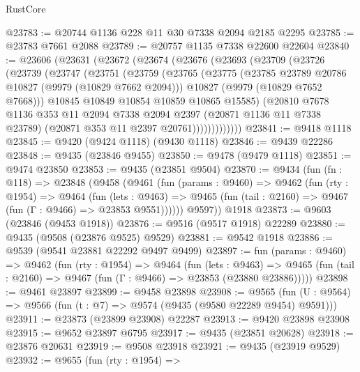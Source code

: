 \begin{lexlean}{RustCore}
\begin{coremodule}
@23783 := @20744 @1136 @228 @11 @30 @7338 @2094 @2185 @2295
@23785 := @23783 @7661 @2088
@23789 := @20757 @1135 @7338 @22600 @22604
@23840 := @23606
    (@23631
      (@23672
        (@23674
          (@23676
            (@23693
              (@23709
                (@23726
                  (@23739
                    (@23747
                      (@23751
                        (@23759
                          (@23765
                            (@23775
                              (@23785 @23789 @20786 @10827 (@9979 (@10829 @7662 @2094)))
                              @10827
                              (@9979 (@10829 @7652 @7668)))
                            @10845
                            @10849
                            @10854
                            @10859
                            @10865
                            @15585)
                          (@20810
                            @7678
                            @1136
                            @353
                            @11
                            @2094
                            @7338
                            @2094
                            @2397
                            (@20871 @1136 @11 @7338 @23789)
                            (@20871 @353 @11 @2397 @20761)))))))))))))
@23841 := @9418 @1118
@23845 := @9420 (@9424 @1118) (@9430 @1118)
@23846 := @9439 @22286
@23848 := @9435 (@23846 @9455)
@23850 := @9478 (@9479 @1118)
@23851 := @9474 @23850
@23853 := @9435 (@23851 @9504)
@23870 := @9434
    (fun (fn : @118) =>
    @23848
      (@9458
        (@9461
          (fun (params : @9460) =>
          @9462
            (fun (rty : @1954) =>
            @9464
              (fun (lets : @9463) =>
              @9465 (fun (tail : @2160) => @9467 (fun (Γ : @9466) => @23853 @9551))))))
        @9597))
    @1918
@23873 := @9603 (@23846 (@9453 @1918))
@23876 := @9516 (@9517 @1918) @22289
@23880 := @9435 (@9508 (@23876 @9525) @9529)
@23881 := @9542 @1918
@23886 := @9539 (@9541 @23881 @22292 @9497 @9499)
@23897 := fun (params : @9460) =>
  @9462
    (fun (rty : @1954) =>
    @9464
      (fun (lets : @9463) =>
      @9465 (fun (tail : @2160) => @9467 (fun (Γ : @9466) => @23853 (@23880 @23886)))))
@23898 := @9461 @23897
@23899 := @9458 @23898
@23908 := @9565
    (fun (U : @9564) => @9566 (fun (t : @7) => @9574 (@9435 (@9580 @22289 @9454) @9591)))
@23911 := @23873 (@23899 @23908) @22287
@23913 := @9420 @23898 @23908
@23915 := @9652 @23897 @6795
@23917 := @9435 (@23851 @20628)
@23918 := @23876 @20631
@23919 := @9508 @23918
@23921 := @9435 (@23919 @9529)
@23932 := @9655
    (fun (rty : @1954) =>

\end{coremodule}
\end{lexlean}
